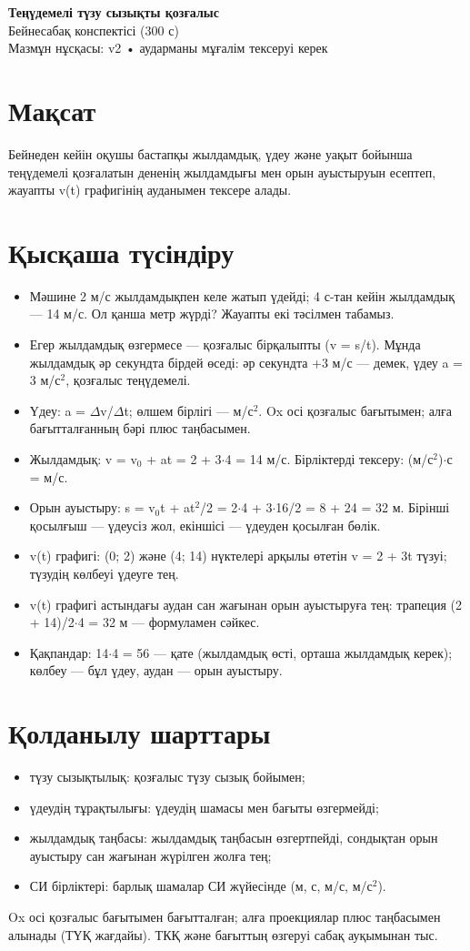\documentclass[11pt]{article}
\begin{document}
{\Large\bfseries Теңүдемелі түзу сызықты қозғалыс}\\[2mm]
Бейнесабақ конспектісі (300 с)\\[1mm]
{\small Мазмұн нұсқасы: v2 • аударманы мұғалім тексеруі керек}
\vspace{4mm}
\section*{Мақсат}
Бейнеден кейін оқушы бастапқы жылдамдық, үдеу және уақыт бойынша теңүдемелі қозғалатын дененің жылдамдығы мен орын ауыстыруын есептеп, жауапты v(t) графигінің ауданымен тексере алады.
\section*{Қысқаша түсіндіру}
\begin{itemize}
\item Мәшине 2 м/с жылдамдықпен келе жатып үдейді; 4 с-тан кейін жылдамдық — 14 м/с. Ол қанша метр жүрді? Жауапты екі тәсілмен табамыз.
\item Егер жылдамдық өзгермесе — қозғалыс бірқалыпты (v = s/t). Мұнда жылдамдық әр секундта бірдей өседі: әр секундта +3 м/с — демек, үдеу a = 3 м/с$^2$, қозғалыс теңүдемелі.
\item Үдеу: a = $\Delta$v/$\Delta$t; өлшем бірлігі — м/с$^2$. Ox осі қозғалыс бағытымен; алға бағытталғанның бәрі плюс таңбасымен.
\item Жылдамдық: v = v$_0$ + at = 2 + 3$\cdot$4 = 14 м/с. Бірліктерді тексеру: (м/с$^2$)$\cdot$с = м/с.
\item Орын ауыстыру: s = v$_0$t + at$^2$/2 = 2$\cdot$4 + 3$\cdot$16/2 = 8 + 24 = 32 м. Бірінші қосылғыш — үдеусіз жол, екіншісі — үдеуден қосылған бөлік.
\item v(t) графигі: (0; 2) және (4; 14) нүктелері арқылы өтетін v = 2 + 3t түзуі; түзудің көлбеуі үдеуге тең.
\item v(t) графигі астындағы аудан сан жағынан орын ауыстыруға тең: трапеция (2 + 14)/2$\cdot$4 = 32 м — формуламен сәйкес.
\item Қақпандар: 14$\cdot$4 = 56 — қате (жылдамдық өсті, орташа жылдамдық керек); көлбеу — бұл үдеу, аудан — орын ауыстыру.
\end{itemize}
\section*{Қолданылу шарттары}
\begin{itemize}
\item түзу сызықтылық: қозғалыс түзу сызық бойымен;
\item үдеудің тұрақтылығы: үдеудің шамасы мен бағыты өзгермейді;
\item жылдамдық таңбасы: жылдамдық таңбасын өзгертпейді, сондықтан орын ауыстыру сан жағынан жүрілген жолға тең;
\item СИ бірліктері: барлық шамалар СИ жүйесінде (м, с, м/с, м/с$^2$).
\end{itemize}
Ox осі қозғалыс бағытымен бағытталған; алға проекциялар плюс таңбасымен алынады (ТҮҚ жағдайы). ТКҚ және бағыттың өзгеруі сабақ ауқымынан тыс.
\end{document}
